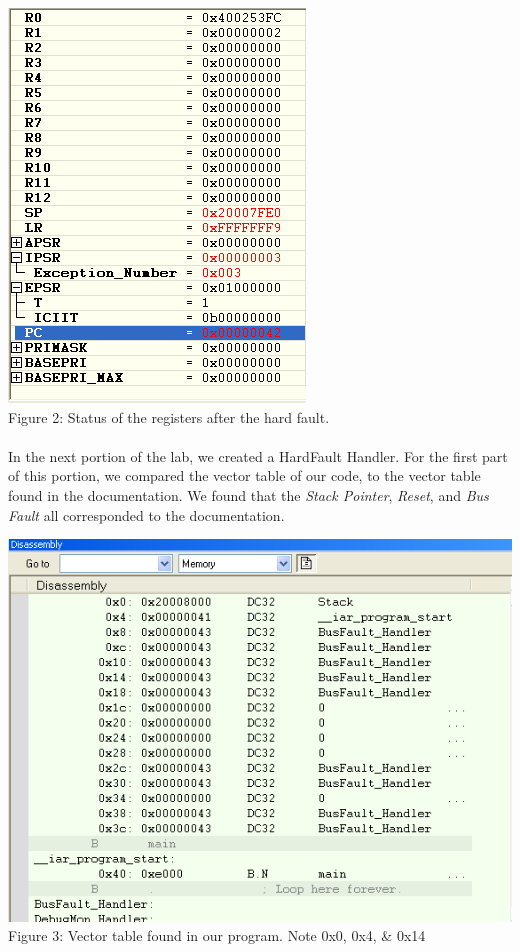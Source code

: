 \documentclass[12pt,a4paper]{report}
\begin{document}
\begin{center}
\includegraphics[scale=0.7]{img/411-register-trimmed.png} \\
\small{Figure 2: Status of the registers after the hard fault.}
\end{center}

\paragraph{}
In the next portion of the lab, we created a HardFault Handler. For the first part of this portion, we compared the vector table of our code, to the vector table found in the documentation. We found that the \emph{Stack Pointer}, \emph{Reset}, and \emph{Bus Fault} all corresponded to the documentation. 

\begin{center}
\includegraphics[scale=0.7]{img/421-diassembly.png} \\
\small{Figure 3: Vector table found in our program. Note 0x0, 0x4, \& 0x14}
\end{center}
\end{document}
